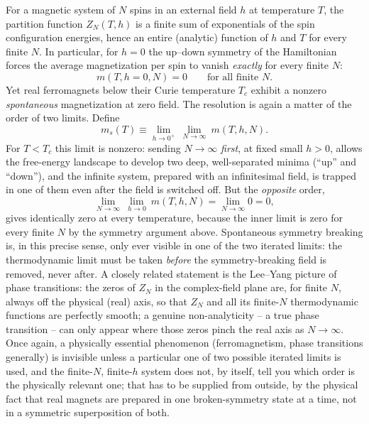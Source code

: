 \documentclass[11pt]{article}
\begin{document}
For a magnetic system of $N$ spins in an external field $h$ at temperature $T$, the partition function $Z_N(T,h)$ is a finite sum of exponentials of the spin configuration energies, hence an entire (analytic) function of $h$ and $T$ for every finite $N$. In particular, for $h=0$ the up--down symmetry of the Hamiltonian forces the average magnetization per spin to vanish \emph{exactly} for every finite $N$:
\begin{equation}
m(T,h=0,N) = 0 \qquad \text{for all finite } N.
\end{equation}
Yet real ferromagnets below their Curie temperature $T_c$ exhibit a nonzero \emph{spontaneous} magnetization at zero field. The resolution is again a matter of the order of two limits. Define
\begin{equation}
m_s(T) \equiv \lim_{h\to0^+}\ \lim_{N\to\infty}\ m(T,h,N).
\end{equation}
For $T<T_c$ this limit is nonzero: sending $N\to\infty$ \emph{first}, at fixed small $h>0$, allows the free-energy landscape to develop two deep, well-separated minima (``up'' and ``down''), and the infinite system, prepared with an infinitesimal field, is trapped in one of them even after the field is switched off. But the \emph{opposite} order,
\begin{equation}
\lim_{N\to\infty}\ \lim_{h\to0}\ m(T,h,N) = \lim_{N\to\infty} 0 = 0,
\end{equation}
gives identically zero at every temperature, because the inner limit is zero for every finite $N$ by the symmetry argument above. Spontaneous symmetry breaking is, in this precise sense, only ever visible in one of the two iterated limits: the thermodynamic limit must be taken \emph{before} the symmetry-breaking field is removed, never after. A closely related statement is the Lee--Yang picture of phase transitions: the zeros of $Z_N$ in the complex-field plane are, for finite $N$, always off the physical (real) axis, so that $Z_N$ and all its finite-$N$ thermodynamic functions are perfectly smooth; a genuine non-analyticity -- a true phase transition -- can only appear where those zeros pinch the real axis as $N\to\infty$. Once again, a physically essential phenomenon (ferromagnetism, phase transitions generally) is invisible unless a particular one of two possible iterated limits is used, and the finite-$N$, finite-$h$ system does not, by itself, tell you which order is the physically relevant one; that has to be supplied from outside, by the physical fact that real magnets are prepared in one broken-symmetry state at a time, not in a symmetric superposition of both.
\end{document}

